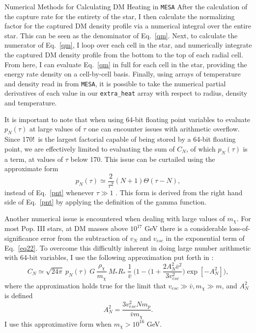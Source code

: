 \documentclass[a4paper,11pt]{article}
\begin{document}
\begin{section}{Numerical Methods for Calculating DM Heating in \texttt{MESA}}
    After the calculation of the capture rate for the entirety of the star, I then calculate the normalizing factor for the captured DM density profile via a numerical integral over the entire star.
    This can be seen as the denominator of Eq.~\ref{qm}.
    Next, to calculate the numerator of Eq.~\ref{qm}, I loop over each cell in the star, and numerically integrate the captured DM density profile from the bottom to the top of each radial cell.
    From here, I can evaluate Eq.~\ref{qm} in full for each cell in the star, providing the energy rate density on a cell-by-cell basis.
    Finally, using arrays of temperature and density read in from \texttt{MESA}, it is possible to take the numerical partial derivatives of each value in our \texttt{extra\_heat} array with respect to radius, density and temperature.

    It is important to note that when using 64-bit floating point variables to evaluate $p_N(\tau)$ at large values of $\tau$ one can encounter issues with arithmetic overflow.
    Since 170!~is the largest factorial capable of being stored by a 64-bit floating point, we are effectively limited to evaluating the sum of $C_N$, of which $p_N(\tau)$ is a term, at values of $\tau$ below 170.
    This issue can be curtailed using the approximate form
    \begin{equation}
        p_N(\tau)  \simeq \frac{2}{\tau^2} (N+1) \Theta(\tau - N),
    \end{equation}
    instead of Eq.~\ref{pnt} whenever $\tau \gg 1$ \cite{Ilie:2020popiii}.
    This form is derived from the right hand side of Eq.~\ref{pnt} by applying the definition of the gamma function.



    Another numerical issue is encountered when dealing with large values of $m_{\chi}$. 
    For most Pop. III stars, at DM masses above $10^{17}$ GeV there is a considerable loss-of-significance error from the subtraction of $v_N$ and $v_{esc}$ in the exponential term of Eq.~\ref{eq22}.
    To overcome this difficultly inherent in doing large number arithmetic with 64-bit variables, I use the following approximation put forth in \cite{Bramante:2017}:
    \begin{equation}
        C_N \simeq \sqrt{24 \pi}~ p_N(\tau) ~ G ~ \frac{\rho_{\chi}}{m_{\chi}} ~M_{*} R_{*} ~\frac{1}{\bar{v}}~ \Bigg(1 - \Big(1 + \frac{2A_N^2 \bar{v}^2}{3v_{esc}^2}\Big)\exp[-A_N^2] \Bigg), 
        \label{CN_aprox}
    \end{equation}
    where the approximation holds true for the limit that $v_{esc} \gg \bar{v}, m_{\chi} \gg m$, and $A_N^2$ is defined
    $$A_N^2 = \frac{3v_{esc}^2 N m_p}{\bar{v} m_{\chi}}.$$
    I use this approximative form when $m_{\chi} > 10^{16}$ GeV.
\end{section}
\end{document}
